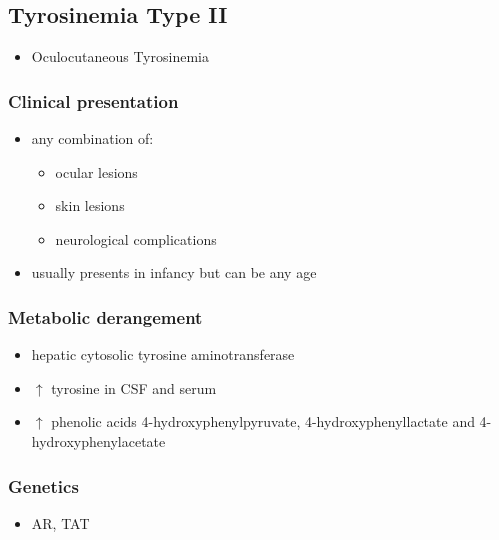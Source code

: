 \documentclass{scrartcl}
\begin{document}
\subsection{Tyrosinemia Type II}
\label{sec:org7577d99}
\begin{itemize}
\item Oculocutaneous Tyrosinemia
\end{itemize}
\subsubsection{Clinical presentation}
\label{sec:org81e3f94}
\begin{itemize}
\item any combination of: 
\begin{itemize}
\item ocular lesions
\item skin lesions
\item neurological complications
\end{itemize}
\item usually presents in infancy but can be any age
\end{itemize}

\subsubsection{Metabolic derangement}
\label{sec:org72eb80e}
\begin{itemize}
\item hepatic cytosolic tyrosine aminotransferase
\end{itemize}
\begin{itemize}
\item \(\uparrow\) tyrosine in CSF and serum
\end{itemize}
\begin{itemize}
\item \(\uparrow\) phenolic acids 4-hydroxyphenylpyruvate,
4-hydroxyphenyllactate and 4-hydroxyphenylacetate
\end{itemize}

\subsubsection{Genetics}
\label{sec:orgf4f256d}
\begin{itemize}
\item AR, TAT
\end{itemize}
\end{document}
